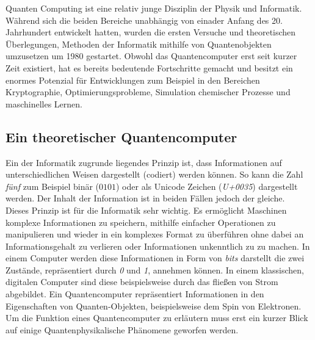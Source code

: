 Quanten Computing ist eine relativ junge Disziplin der Physik und Informatik. Während sich die beiden Bereiche unabhängig von einader Anfang des 20. Jahrhundert entwickelt hatten, wurden die ersten Versuche und theoretischen Überlegungen, Methoden der Informatik mithilfe von Quantenobjekten umzusetzen um 1980 gestartet. Obwohl das Quantencomputer erst seit kurzer Zeit existiert, hat es bereits bedeutende Fortschritte gemacht und besitzt ein enormes Potenzial für Entwicklungen zum Beispiel in den Bereichen Kryptographie, Optimierungsprobleme, Simulation chemischer Prozesse und maschinelles Lernen.

\subsection{Ein theoretischer Quantencomputer}
Ein der Informatik zugrunde liegendes Prinzip ist, dass \cite[S122]{steane_quantum_1998} Informationen auf unterschiedlichen Weisen dargestellt (codiert) werden können. So kann die Zahl \textit{fünf} zum Beispiel binär ($0101$) oder als Unicode Zeichen (\textit{U+0035}) dargestellt werden. Der Inhalt der Information ist in beiden Fällen jedoch der gleiche.\\
Dieses Prinzip ist für die Informatik sehr wichtig. Es ermöglicht Maschinen komplexe Informationen zu speichern, mithilfe einfacher Operationen zu manipulieren und wieder in ein komplexes Format zu überführen ohne dabei an Informationsgehalt zu verlieren oder Informationen unkenntlich zu zu machen. In einem Computer werden diese Informationen in Form von \textit{bits} darstellt die zwei Zustände, repräsentiert durch \textit{0} und \textit{1}, annehmen können. In einem klassischen, digitalen Computer sind diese beispielsweise durch das fließen von Strom abgebildet. Ein Quantencomputer repräsentiert Informationen in den Eigenschaften von Quanten-Objekten, beispielsweise dem Spin von Elektronen.\\
Um die Funktion eines Quantencomputer zu erläutern muss erst ein kurzer Blick auf einige Quantenphysikalische Phänomene geworfen werden.

